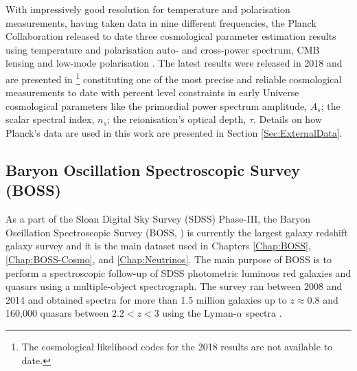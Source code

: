 \qquad With impressively good resolution for temperature and polarisation measurements, having taken data in nine different frequencies, the Planck Collaboration released to date three cosmological parameter estimation results using temperature and polarisation auto- and cross-power spectrum, CMB lensing and low-mode polarisation \citep{planck2013,PlanckCosmology2016,2018PlanckCosmology}. The latest results were released in 2018 and are presented in \cite{2018PlanckCosmology} \footnote{The cosmological likelihood codes for the 2018 results are not available to date.} constituting one of the most precise and reliable cosmological measurements to date with percent level constraints in early Universe cosmological parameters like the primordial power spectrum amplitude, $A_s$; the scalar spectral index, $n_s$; the reionisation's optical depth, $\tau$. Details on how Planck's data are used in this work are presented in Section \ref{Sec:ExternalData}.


\subsection{Baryon Oscillation Spectroscopic Survey (BOSS)}
As a part of the Sloan Digital Sky Survey (SDSS) Phase-III, the Baryon Oscillation Spectroscopic Survey (BOSS, \citealt{BOSS}) is currently the largest galaxy redshift galaxy survey and it is the main dataset used in Chapters \ref{Chap:BOSS}, \ref{Chap:BOSS-Cosmo}, and \ref{Chap:Neutrinos}. The main purpose of BOSS is to perform a spectroscopic follow-up of SDSS photometric luminous red galaxies and quasars using a multiple-object spectrograph. The survey ran between 2008 and 2014 and obtained spectra for more than 1.5 million galaxies up to $z\approx 0.8$ \citep{BOSSCatalogue2016} and 160,000 quasars between $2.2 < z < 3$ using the Lyman-$\alpha$ spectra \citep{2013LyAlphaBOSS}.

